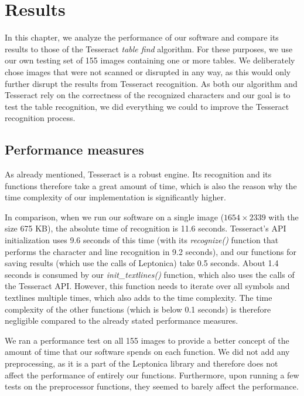 \chapter{Results}

In this chapter, we analyze the performance of our software and compare its results to those of the Tesseract \emph{table find} algorithm. For these purposes, we use our own testing set of 155 images containing one or more tables. We deliberately chose images that were not scanned or disrupted in any way, as this would only further disrupt the results from Tesseract recognition. As both our algorithm and Tesseract rely on the correctness of the recognized characters and our goal is to test the table recognition, we did everything we could to improve the Tesseract recognition process. 

\section{Performance measures}

As already mentioned, Tesseract is a robust engine. Its recognition and its functions therefore take a great amount of time, which is also the reason why the time complexity of our implementation is significantly higher. 

In comparison, when we run our software on a single image ($1654\times2339$ with the size 675 KB), the absolute time of recognition is 11.6 seconds. Tesseract's API initialization uses 9.6 seconds of this time (with its \emph{recognize()} function that performs the character and line recognition in 9.2 seconds), and our functions for saving results (which use the calls of Leptonica) take 0.5 seconds. About 1.4 seconds is consumed by our \emph{init\_textlines()} function, which also uses the calls of the Tesseract API. However, this function needs to iterate over all symbols and textlines multiple times, which also adds to the time complexity. The time complexity of the other functions (which is below 0.1 seconds) is therefore negligible compared to the already stated performance measures.

We ran a performance test on all 155 images to provide a better concept of the amount of time that our software spends on each function. We did not add any preprocessing, as it is a part of the Leptonica library and therefore does not affect the performance of entirely our functions. Furthermore, upon running a few tests on the preprocessor functions, they seemed to barely affect the performance.

